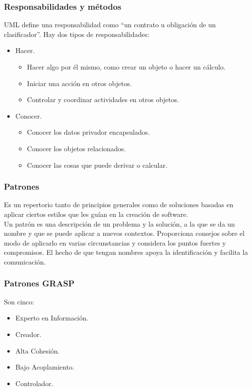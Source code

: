 \subsubsection{Responsabilidades y métodos}
UML define una responsabilidad como ``un contrato u obligación de un clasificador''. Hay dos tipos de responsabilidades:
\begin{itemize}
\item Hacer.
\begin{itemize}
\item Hacer algo por él mismo, como crear un objeto o hacer un cálculo.
\item Iniciar una acción en otros objetos.
\item Controlar y coordinar actividades en otros objetos.
\end{itemize}
\item Conocer.
\begin{itemize}
\item Conocer los datos privador encapsulados.
\item Conocer los objetos relacionados.
\item Conocer las cosas que puede derivar o calcular.
\end{itemize}
\end{itemize}
\subsubsection{Patrones}
Es un repertorio tanto de principios generales como de soluciones basadas en aplicar ciertos estilos que les guían en la creación de software.\\
Un patrón es una descripción de un problema y la solución, a la que se da un nombre y que se puede aplicar a nuevos contextos. Proporciona consejos sobre el modo de aplicarlo en varias circunstancias y considera los puntos fuertes y compromisos. El hecho de que tengan nombres apoya la identificación y facilita la comunicación.
\subsubsection{Patrones GRASP}
Son cinco:
\begin{itemize}
\item Experto en Información.
\item Creador.
\item Alta Cohesión.
\item Bajo Acoplamiento.
\item Controlador.
\end{itemize}
